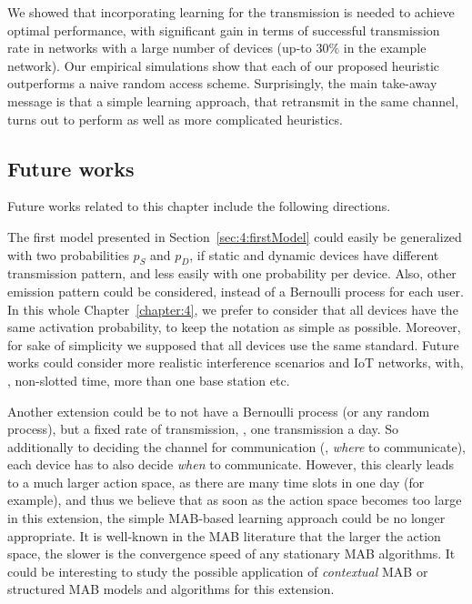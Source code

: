 We showed that incorporating learning for the transmission is needed to achieve optimal performance, with significant gain in terms of successful transmission rate in networks with a large number of devices (up-to $30\%$ in the example network).
Our empirical simulations show that each of our proposed heuristic outperforms a naive random access scheme.
Surprisingly, the main take-away message is that a simple \UCB{} learning approach, that retransmit in the same channel, turns out to perform as well as more complicated heuristics.


\subsection*{Future works}
\label{sub:4:futureWorks}

Future works related to this chapter include the following directions.



The first model presented in Section~\ref{sec:4:firstModel} could easily be generalized with two probabilities $p_S$ and $p_D$, if static and dynamic devices have different transmission pattern, and less easily with one probability per device. Also, other emission pattern could be considered, instead of a Bernoulli process for each user.
In this whole Chapter~\ref{chapter:4}, we prefer to consider that all devices have the same activation probability, to keep the notation as simple as possible.
%
Moreover, for sake of simplicity we supposed that all devices use the same standard.
Future works could consider more realistic interference scenarios and IoT networks, with, \eg, non-slotted time, more than one base station etc.

Another extension could be to not have a Bernoulli process (or any random process), but a fixed rate of transmission, \eg, one transmission a day.
So additionally to deciding the channel for communication (\ie, \emph{where} to communicate), each device has to also decide \emph{when} to communicate.
However, this clearly leads to a much larger action space, as there are many time slots in one day (for example), and thus we believe that as soon as the action space becomes too large in this extension, the simple MAB-based learning approach could be no longer appropriate.
It is well-known in the MAB literature that the larger the action space, the slower is the convergence speed of any stationary MAB algorithms.
It could be interesting to study the possible application of \emph{contextual} MAB \cite{Li10,Luo18} or structured MAB \cite{Combes17} models and algorithms for this extension.

